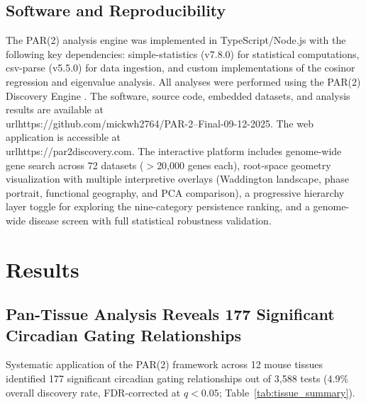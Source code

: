 \documentclass[11pt,a4paper]{article}
\begin{document}
\subsection{Software and Reproducibility}

The PAR(2) analysis engine was implemented in TypeScript/Node.js with the following key dependencies: simple-statistics (v7.8.0) for statistical computations, csv-parse (v5.5.0) for data ingestion, and custom implementations of the cosinor regression and eigenvalue analysis. All analyses were performed using the PAR(2) Discovery Engine \citep{whiteside2026zenodo}. The software, source code, embedded datasets, and analysis results are available at \\url{https://github.com/mickwh2764/PAR-2--Final-09-12-2025}. The web application is accessible at \\url{https://par2discovery.com}. The interactive platform includes genome-wide gene search across 72 datasets ($>$20,000 genes each), root-space geometry visualization with multiple interpretive overlays (Waddington landscape, phase portrait, functional geography, and PCA comparison), a progressive hierarchy layer toggle for exploring the nine-category persistence ranking, and a genome-wide disease screen with full statistical robustness validation.

\section{Results}

\subsection{Pan-Tissue Analysis Reveals 177 Significant Circadian Gating Relationships}

Systematic application of the PAR(2) framework across 12 mouse tissues identified 177 significant circadian gating relationships out of 3,588 tests (4.9\% overall discovery rate, FDR-corrected at $q < 0.05$; Table~\ref{tab:tissue_summary}).
\end{document}
